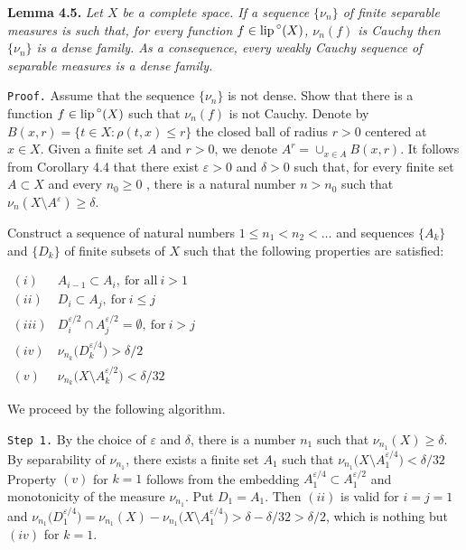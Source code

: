 \documentclass[11pt,a4paper]{article}
\begin{document}
\vspace{1em} {\bf Lemma 4.5.} \sl
Let $X$ be a complete space.
If a sequence $\{\nu_n\}$ of finite separable measures is such
that, for every function $f\in{\rm lip\,}^{\circ}(X)$,
$\nu_n(f)$ is Cauchy
then $\{\nu_n\}$ is a dense family.
As a consequence, every weakly Cauchy sequence
of separable measures is a dense family. \rm
\vspace{1em} %

{\tt Proof.} %
Assume that the sequence $\{\nu_n\}$ is not dense. Show that there is
a function $f\in{\rm lip\,}^{\circ}(X)$
such that $\nu_n(f)$ is not Cauchy. Denote by
${B(x,r)=\{t\in X: \rho(t,x)\le r\}}$ the closed ball
of radius $r>0$ centered at $x\in X$.
Given a finite set $A$ and $r>0$, we denote
$A^r=\cup_{x\in A} B(x,r)$.
It follows from
Corollary 4.4 that there exist $\varepsilon>0$ and $\delta>0$ such that,
for every finite set $A\subset X$ and every $n_0\ge 0$ ,
there is a natural number $n>n_0$ such that
$\nu_n(X \setminus A^{\varepsilon}) \ge \delta$.

Construct a sequence of natural numbers $1\le n_1<n_2<\ldots$
and sequences $\{A_k\}$ and $\{D_k\}$ of finite
subsets of $X$ such that the following properties are satisfied:

$\begin{array}{ll}
(i) & A_{i-1}\subset A_i, ~\mbox{for all}~ i>1 \\
(ii) & D_i\subset A_j, ~\mbox{for}~ i\le j \\
(iii) & D_i^{\varepsilon/2} \cap A_j^{\varepsilon/2} = \emptyset, ~\mbox{for}~ i>j \\
(iv) & \nu_{n_k} \bigl( D_k^{\varepsilon/4} \bigr) >\delta/2 \\
(v) & \nu_{n_k} \bigl( X \setminus A_k^{\varepsilon/2} \bigr) <\delta/32
\end{array}$

We proceed by the following algorithm.

{\tt Step 1.} By the choice of $\varepsilon$ and $\delta$,
there is a number $n_1$ such that $\nu_{n_1}(X)\ge\delta$.
By separability of $\nu_{n_1}$,
there exists a finite set $A_1$ such that
$\nu_{n_1} \bigl( X\setminus A_1^{\varepsilon/4} \bigr) <\delta/32$
Property $(v)$ for $k=1$ follows from the embedding
$A_1^{\varepsilon/4}\subset A_1^{\varepsilon/2}$
and monotonicity of the measure $\nu_{n_1}$.
Put $D_1=A_1$. Then $(ii)$ is valid for $i=j=1$ and
$\nu_{n_1} \bigl( D_1^{\varepsilon/4} \bigr) =
 \nu_{n_1}(X) - \nu_{n_1} \bigl( X\setminus A_1^{\varepsilon/4} \bigr)
 > \delta - \delta/32 > \delta/2$,
which is nothing but $(iv)$ for $k=1$.
\end{document}
